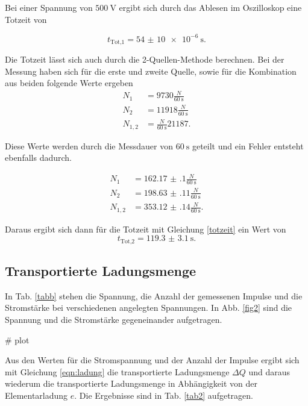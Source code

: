 Bei einer Spannung von $\SI{500}{\volt}$ ergibt sich durch das Ablesen im Oszilloskop eine Totzeit von 

\begin{equation*}
    t_\text{Tot,1} = \SI{54(10)e-6}{\second}.
\end{equation*}


Die Totzeit lässt sich auch durch die 2-Quellen-Methode berechnen. 
Bei der Messung haben sich für die erste und zweite Quelle, sowie für die Kombination aus beiden folgende Werte ergeben
\begin{align*} 
   N_1 &= 9730 \frac{N}{\SI{60}{\second}}\\
   N_2 &= 11918 \frac{N}{\SI{60}{\second}} \\
   N_{1,2} &= \frac{N}{\SI{60}{\second}} 21187.
\end{align*}

Diese Werte werden durch die Messdauer von $\SI{60}{\second}$ geteilt und ein Fehler entsteht ebenfalls dadurch. 

\begin{align*} 
   N_1 &= \num{162.17(10)} \frac{N}{\SI{60}{\second}}\\
   N_2 &= \num{198.63(11)} \frac{N}{\SI{60}{\second}} \\
   N_{1,2} &=\num{353.12(14)} \frac{N}{\SI{60}{\second}}.
\end{align*}

Daraus ergibt sich dann für die Totzeit mit Gleichung \eqref{totzeit}
ein Wert von 
\begin{equation*} 
    t_\text{Tot,2} = \SI{119.3(31)}{\second}.
\end{equation*} 

\subsection{Transportierte Ladungsmenge}
In Tab. \ref{tabb} stehen die Spannung, die Anzahl der gemessenen Impulse und die Stromstärke bei verschiedenen angelegten Spannungen.
In Abb. \ref{fig2} sind die Spannung und die Stromstärke gegeneinander aufgetragen. 

# plot

Aus den Werten für die Stromspannung und der Anzahl der Impulse ergibt sich mit Gleichung \eqref{eqn:ladung} die transportierte Ladungsmenge $\Delta Q$ und daraus wiederum die transportierte Ladungsmenge in Abhängigkeit von der Elementarladung $e$. Die Ergebnisse sind in Tab. \ref{tab2} aufgetragen. 




